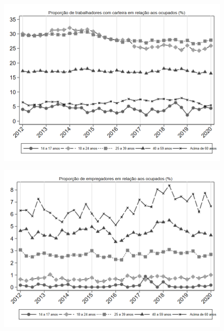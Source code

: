 \begin{frame}[label=_composicao_demografica_faixa_etaria_prop_empregadoCC]{}
\textit{\hyperlink{_composicao_demografica_faixa_etaria}{}}
\begin{figure}
  \centering
  \includegraphics[width=1.0\linewidth]{../../analysis/output/composicao_demografica/faixa_etaria/_composicao_demografica_faixa_etaria_prop_empregadoCC.png}
  \caption{}
  \label{fig:_composicao_demografica_faixa_etaria_prop_empregadoCC}
\end{figure}
\end{frame}

\begin{frame}[label=_composicao_demografica_faixa_etaria_prop_empregador]{}
\textit{\hyperlink{_composicao_demografica_faixa_etaria}{}}
\begin{figure}
  \centering
  \includegraphics[width=1.0\linewidth]{../../analysis/output/composicao_demografica/faixa_etaria/_composicao_demografica_faixa_etaria_prop_empregador.png}
  \caption{}
  \label{fig:_composicao_demografica_faixa_etaria_prop_empregador}
\end{figure}
\end{frame}



